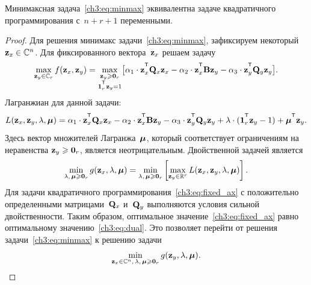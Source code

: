 \begin{statement}
	Минимаксная задача~\eqref{ch3:eq:minmax} эквивалентна задаче квадратичного программирования с~$n + r + 1$ переменными.
\end{statement}
\begin{proof}
	Для решения минимакс задачи~\eqref{ch3:eq:minmax}, зафиксируем некоторый~$\mathbf{z}_x \in \mathbb{C}^n$. Для фиксированного вектора~$\mathbf{z}_x$ решаем задачу
	\begin{equation}
		\max_{\bz_y \in \mathbb{C}_r} f(\bz_x, \bz_y) = \max_{\substack{\bz_y \geq \bZero_r \\ \bOne_r^{\T}\bz_y=1}} \bigl[\alpha_1 \cdot \bz_x^{\T} \bQ_x \bz_x - \alpha_2 \cdot \bz_x^{\T} \bB \bz_y - \alpha_3 \cdot \bz_y^{\T} \bQ_y \bz_y \bigr].
		\label{ch3:eq:fixed_ax}
	\end{equation}
	Лагранжиан для данной задачи:
	\begin{equation*}
		L(\bz_x, \bz_y, \lambda, \bmu) = \alpha_1 \cdot \bz_x^{\T} \bQ_x \bz_x - \alpha_2 \cdot \bz_x^{\T} \bB \bz_y - \alpha_3 \cdot \bz_y^{\T} \bQ_y \bz_y + \lambda \cdot  (\bOne_r^{\T} \bz_y - 1) + \bmu^{\T} \bz_y.
	\end{equation*}
	Здесь вектор множителей Лагранжа~$\boldsymbol{\mu}$, который соответствует ограничениям на неравенства $\mathbf{z}_y \geqslant \boldsymbol{0}_r$, является неотрицательным.
	Двойственной задачей является
	\begin{equation}
		\min_{\lambda, \, \boldsymbol{\mu} \geqslant \boldsymbol{0}_r} g(\mathbf{z}_x, \lambda, \boldsymbol{\mu}) = \min_{\lambda, \, \boldsymbol{\mu} \geqslant \boldsymbol{0}_r}  \left[\max_{\mathbf{z}_y \in \mathbb{R}^r} L(\mathbf{z}_x, \mathbf{z}_y, \lambda, \boldsymbol{\mu}) \right].
		\label{ch3:eq:dual}
	\end{equation}
	Для задачи квадратичного программирования~\eqref{ch3:eq:fixed_ax} с положительно определенными матрицами~$\mathbf{Q}_x$ и~$\mathbf{Q}_y$ выполняются условия сильной двойственности. Таким образом, оптимальное значение~\eqref{ch3:eq:fixed_ax} равно оптимальному значению~\eqref{ch3:eq:dual}. Это позволяет перейти от решения задачи~\eqref{ch3:eq:minmax} к решению задачи
	\begin{equation}
	\min_{\mathbf{z}_x \in \mathbb{C}^n, \, \lambda, \, \boldsymbol{\mu} \geqslant \boldsymbol{0}_r} g(\mathbf{z}_y, \lambda, \boldsymbol{\mu}).
	\label{ch3:eq:dual_maxmin}
	\end{equation}
	

\end{proof}
